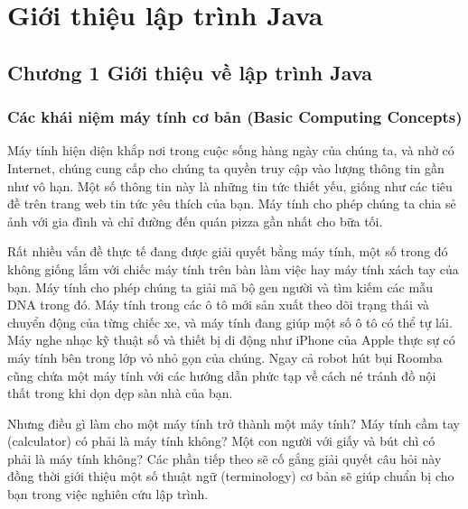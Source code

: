 
\providecommand{\pandocbounded}[1]{#1}
\makeatletter
\def\maxwidth{\ifdim\Gin@nat@width>\linewidth\linewidth\else\Gin@nat@width\fi}
\def\maxheight{\ifdim\Gin@nat@height>\textheight\textheight\else\Gin@nat@height\fi}
\makeatother
\providecommand{\tightlist}{\setlength{\itemsep}{0pt}\setlength{\parskip}{0pt}}
\chapter{Giới thiệu lập trình Java}
\section{Chương 1 Giới thiệu về lập trình
Java}\label{chux1b0ux1a1ng-1-giux1edbi-thiux1ec7u-vux1ec1-lux1eadp-truxecnh-java}

\subsection{Các khái niệm máy tính cơ bản (Basic Computing
Concepts)}\label{cuxe1c-khuxe1i-niux1ec7m-muxe1y-tuxednh-cux1a1-bux1ea3n-basic-computing-concepts}

Máy tính hiện diện khắp nơi trong cuộc sống hàng ngày của chúng ta, và
nhờ có Internet, chúng cung cấp cho chúng ta quyền truy cập vào lượng
thông tin gần như vô hạn. Một số thông tin này là những tin tức thiết
yếu, giống như các tiêu đề trên trang web tin tức yêu thích của bạn. Máy
tính cho phép chúng ta chia sẻ ảnh với gia đình và chỉ đường đến quán
pizza gần nhất cho bữa tối.

Rất nhiều vấn đề thực tế đang được giải quyết bằng máy tính, một số
trong đó không giống lắm với chiếc máy tính trên bàn làm việc hay máy
tính xách tay của bạn. Máy tính cho phép chúng ta giải mã bộ gen người
và tìm kiếm các mẫu DNA trong đó. Máy tính trong các ô tô mới sản xuất
theo dõi trạng thái và chuyển động của từng chiếc xe, và máy tính đang
giúp một số ô tô có thể tự lái. Máy nghe nhạc kỹ thuật số và thiết bị di
động như iPhone của Apple thực sự có máy tính bên trong lớp vỏ nhỏ gọn
của chúng. Ngay cả robot hút bụi Roomba cũng chứa một máy tính với các
hướng dẫn phức tạp về cách né tránh đồ nội thất trong khi dọn dẹp sàn
nhà của bạn.

Nhưng điều gì làm cho một máy tính trở thành một máy tính? Máy tính cầm
tay (calculator) có phải là máy tính không? Một con người với giấy và
bút chì có phải là máy tính không? Các phần tiếp theo sẽ cố gắng giải
quyết câu hỏi này đồng thời giới thiệu một số thuật ngữ (terminology) cơ
bản sẽ giúp chuẩn bị cho bạn trong việc nghiên cứu lập trình.

